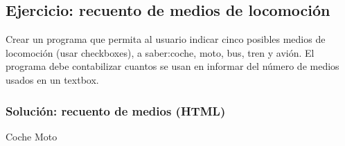 \documentclass[letterpaper,10pt,spanish]{sphinxmanual}
\begin{document}
\subsection{Ejercicio: recuento de medios de locomoción}
\label{\detokenize{tema4:ejercicio-recuento-de-medios-de-locomocion}}
Crear un programa que permita al usuario indicar cinco posibles medios de locomoción (usar checkboxes), a saber:coche, moto, bus, tren y avión. El programa debe contabilizar cuantos se usan en informar del número de medios usados en un textbox.


\subsubsection{Solución: recuento de medios (HTML)}
\label{\detokenize{tema4:solucion-recuento-de-medios-html}}
\begin{sphinxVerbatim}[commandchars=\\\{\}]
         
     
         
         Coche
     
         
         Moto
     
         

\end{sphinxVerbatim}
\end{document}
